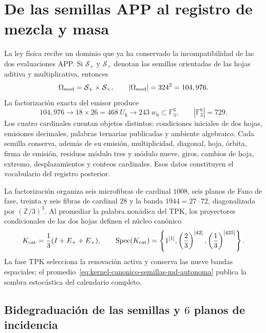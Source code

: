 \section{De las semillas APP al registro de mezcla y masa}
\label{sec:semillas-registro-mezcla-autonoma}

La ley física recibe un dominio que ya ha conservado la incompatibilidad de
las dos evaluaciones APP. Si
\(\mathcal S_+\) y \(\mathcal S_\times\) denotan las semillas orientadas de
las hojas aditiva y multiplicativa, entonces
\begin{equation}
 \Omega_{\rm seed}=\mathcal S_+\times\mathcal S_\times,
 \qquad
 |\Omega_{\rm seed}|=324^2=104,976.
 \label{eq:dominio-semillas-md-autonoma}
\end{equation}
La factorización exacta del emisor produce
\begin{equation}
 104,976
 \longrightarrow18\times26=468\ U_6
 \longrightarrow243\ w_6\subset\mathbb F_3^6,
 \qquad |\mathbb F_3^6|=729.
 \label{eq:embudo-semillas-md-autonoma}
\end{equation}
Los cuatro cardinales cuentan objetos distintos: condiciones iniciales de
dos hojas, emisiones decimales, palabras ternarias publicadas y ambiente
algebraico. Cada semilla conserva, además de su emisión, multiplicidad,
diagonal, hoja, órbita, firma de emisión, residuos módulo tres y módulo
nueve, giros, cambios de hoja, extremo, desplazamientos y conteos
cardinales. Esos datos constituyen el vocabulario del registro posterior.

La factorización organiza seis microfibras de cardinal \(1008\), seis planos
de Fano de fase, treinta y seis fibras de cardinal \(28\) y la banda
\(1944=27\cdot72\), diagonalizada por \((\mathbb Z/3)^3\). Al promediar la
palabra nonádica del TPK, los proyectores condicionales de las dos hojas
definen el núcleo canónico
\begin{equation}
 K_{\rm cat}=\frac13(I+E_++E_\times),
 \qquad
 \operatorname{Spec}(K_{\rm cat})
 =\left\{1^{[1]},
 \left(\frac23\right)^{[42]},
 \left(\frac13\right)^{[425]}\right\}.
 \label{eq:kernel-canonico-semillas-md-autonoma}
\end{equation}
La fase TPK selecciona la renovación activa y conserva las nueve bandas
espaciales; el promedio~\eqref{eq:kernel-canonico-semillas-md-autonoma}
publica la sombra estocástica del calendario completo.

\subsection{Bidegraduación de las semillas y \(6\) planos de incidencia}

